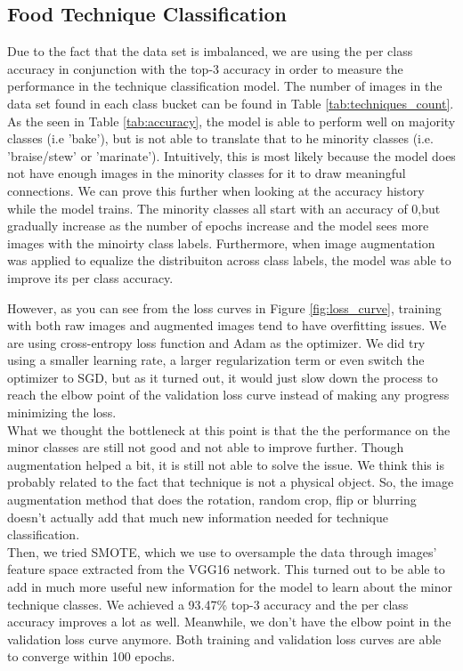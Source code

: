 \documentclass[10pt,twocolumn,letterpaper]{article}
\begin{document}
\subsection{Food Technique Classification}
Due to the fact that the data set is imbalanced, we are using the per class accuracy in conjunction with the top-3 accuracy in order to measure the performance in the technique classification model. The number of images in the data set found in each class bucket can be found in Table \ref{tab:techniques_count}. As the seen in Table \ref{tab:accuracy}, the model is able to perform well on majority classes (i.e 'bake'), but is not able to translate that to he minority classes (i.e. 'braise/stew' or 'marinate'). Intuitively, this is most likely because the model does not have enough images in the minority classes for it to draw meaningful connections. We can prove this further when looking at the accuracy history while the model trains. The minority classes all start with an accuracy of 0,but gradually increase as the number of epochs increase and the model sees more images with the minoirty class labels. Furthermore, when image augmentation was applied to equalize the distribuiton across class labels, the model was able to improve its per class accuracy. 

However, as you can see from the loss curves in Figure  \ref{fig:loss_curve}, training with both raw images and augmented images tend to have overfitting issues. We are using cross-entropy loss function and Adam as the optimizer. We did try using a smaller learning rate, a larger regularization term or even switch the optimizer to SGD, but as it turned out, it would just slow down the process to reach the elbow point of the validation loss curve instead of making any progress minimizing the loss. \\

What we thought the bottleneck at this point is that the the performance on the minor classes are still not good and not able to improve further. Though augmentation helped a bit, it is still not able to solve the issue. We think this is probably related to the fact that technique is not a physical object. So, the image augmentation method that does the rotation, random crop, flip or blurring doesn’t actually add that much new information needed for technique classification. \\
Then, we tried SMOTE, which we use to oversample the data through images’ feature space extracted from the VGG16 network. This turned out to be able to add in much more useful new information for the model to learn about the minor technique classes. We achieved a 93.47\% top-3 accuracy and the per class accuracy improves a lot as well. Meanwhile, we don’t have the elbow point in the validation loss curve anymore. Both training and validation loss curves are able to converge within 100 epochs.
\end{document}
